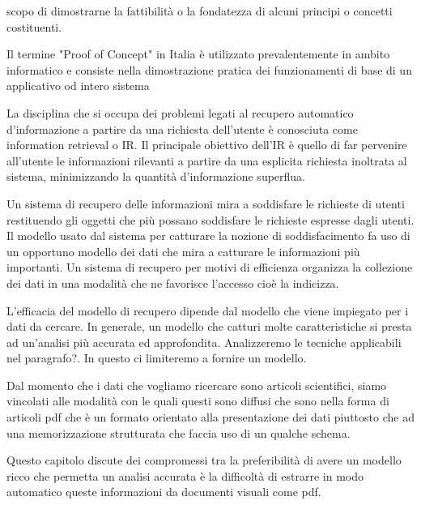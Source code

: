 scopo di dimostrarne la fattibilità o la fondatezza di alcuni principi o concetti costituenti.

Il termine "Proof of Concept" in Italia è utilizzato prevalentemente in ambito informatico e consiste nella dimostrazione pratica dei funzionamenti di base di un applicativo od intero sistema 

La disciplina che si occupa dei problemi legati al recupero automatico d’informazione a partire da una richiesta dell’utente è conosciuta come information retrieval o IR. Il principale obiettivo dell’IR è quello di far pervenire all’utente le informazioni rilevanti a partire da una esplicita richiesta inoltrata al sistema, minimizzando la quantità d’informazione superflua.

Un sistema di recupero delle informazioni mira a soddisfare le richieste di utenti restituendo gli oggetti che più possano soddisfare le richieste espresse dagli utenti. Il modello usato dal sistema per catturare la nozione di soddisfacimento fa uso di un opportuno modello dei dati che mira a catturare le informazioni più importanti. Un sistema di recupero per motivi di efficienza organizza la collezione dei dati in una modalità che ne favorisce l'accesso cioè la indicizza.

L'efficacia del modello di recupero dipende dal modello che viene impiegato per i dati da cercare. In generale, un modello che catturi molte caratteristiche si presta ad un'analisi più accurata ed approfondita. Analizzeremo le tecniche applicabili nel paragrafo?. In questo ci limiteremo a fornire un modello.

Dal momento che i dati che vogliamo ricercare sono articoli scientifici, siamo vincolati alle modalità con le quali questi sono diffusi che sono nella forma di articoli pdf che è un formato orientato alla presentazione dei dati piuttosto che ad una memorizzazione strutturata che faccia uso di un qualche schema.

Questo capitolo discute dei compromessi tra la preferibilità di avere un modello ricco che permetta un analisi accurata è la difficoltà di estrarre in modo automatico queste informazioni da documenti visuali come pdf.

